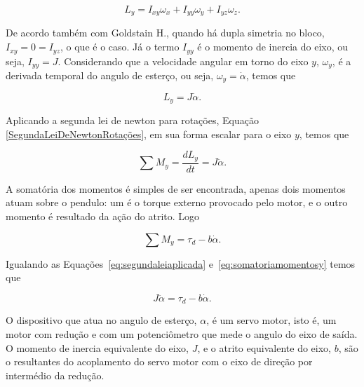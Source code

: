         \begin{equation}
            L_y = I_{xy}\omega_x + I_{yy}\omega_y + I_{yz}\omega_z.
            \label{MomentoAngularOriginal}
        \end{equation}
        
        De acordo também com Goldstain H., quando há dupla simetria no bloco, $I_{xy} = 0 = I_{yz}$, o que é o caso. Já o termo $I_{yy}$ é o momento de inercia do eixo, ou seja, $I_{yy}=J$. Considerando que a velocidade angular em torno do eixo $y$, $\omega_y$, é a derivada temporal do angulo de esterço, ou seja, $\omega_y=\dot \alpha$, temos que
        
        \begin{equation}
            L_y = J \dot \alpha.
        \end{equation}
        
        Aplicando a segunda lei de newton para rotações, Equação \eqref{SegundaLeiDeNewtonRotações}, em sua forma escalar para o eixo $y$, temos que
            
        \begin{equation}
            \sum M_y
            = \frac{d L_y}{dt}
            = J \ddot \alpha.
            \label{eq:segundaleiaplicada}
        \end{equation}
        
        A somatória dos momentos é simples de ser encontrada, apenas dois momentos atuam sobre o pendulo: um é o torque externo provocado pelo motor, e o outro momento é resultado da ação do atrito. Logo
    
        \begin{equation}
            \sum M_y  = \tau _d - b \dot \alpha.
            \label{eq:somatoriamomentosy}
        \end{equation}
    
        Igualando as Equações~\eqref{eq:segundaleiaplicada} e~\eqref{eq:somatoriamomentosy} temos que
        
        \begin{equation}
            J \ddot \alpha  = \tau _d - b \dot \alpha.
        \end{equation}
        
        O dispositivo que atua no angulo de esterço, $\alpha$, é um servo motor, isto é, um motor com redução e com um potenciômetro que mede o angulo do eixo de saída. O momento de inercia equivalente do eixo, $J$, e o atrito equivalente do eixo, $b$, são o resultantes do acoplamento do servo motor com o eixo de direção por intermédio da redução.
        
